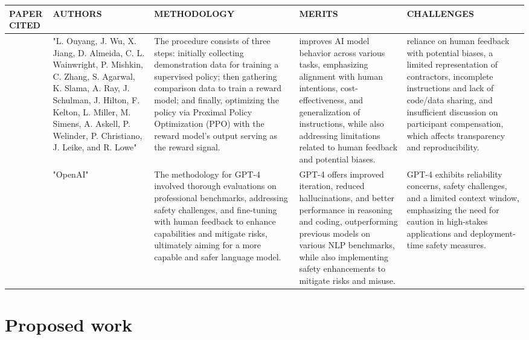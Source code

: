 \documentclass[fleqn,10pt]{thescipub} %
\begin{document}
\begin{table}
\begin{center}
 \centering
  \small %
    \begin{tabular}{ |p{1cm}|p{2cm}|p{4cm}|p{4cm}|p{4cm}| }
\hline
\centering PAPER CITED & \centering  AUTHORS & \centering METHODOLOGY &  \centering MERITS &  \centering CHALLENGES \arraybackslash \\ 
\hline
[39]  & "L. Ouyang, J. Wu, X. Jiang, D. Almeida, C. L. Wainwright, P. Mishkin, C. Zhang, S. Agarwal, K. Slama, A. Ray, J. Schulman, J. Hilton, F. Kelton, L. Miller, M. Simens, A. Askell, P. Welinder, P. Christiano, J. Leike, and R. Lowe" & The procedure consists of three steps: initially collecting demonstration data for training a supervised policy; then gathering comparison data to train a reward model; and finally, optimizing the policy via Proximal Policy Optimization (PPO) with the reward model's output serving as the reward signal. & improves AI model behavior across various tasks, emphasizing alignment with human intentions, cost-effectiveness, and generalization of instructions, while also addressing limitations related to human feedback and potential biases. & reliance on human feedback with potential biases, a limited representation of contractors, incomplete instructions and lack of code/data sharing, and insufficient discussion on participant compensation, which affects transparency and reproducibility. \\
\hline
[40]& "OpenAI" & The methodology for GPT-4 involved thorough evaluations on professional benchmarks, addressing safety challenges, and fine-tuning with human feedback to enhance capabilities and mitigate risks, ultimately aiming for a more capable and safer language model. & GPT-4 offers improved iteration, reduced hallucinations, and better performance in reasoning and coding, outperforming previous models on various NLP benchmarks, while also implementing safety enhancements to mitigate risks and misuse. & GPT-4 exhibits reliability concerns, safety challenges, and a limited context window, emphasizing the need for caution in high-stakes applications and deployment-time safety measures. \\
\hline
\end{tabular}
\end{center}
\end{table}

\baselineskip

\section{Proposed work}
\end{document}
